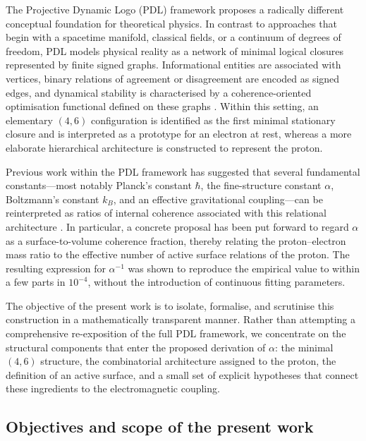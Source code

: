 \documentclass[11pt,a4paper]{article}
\theoremstyle{plain}
\theoremstyle{definition}
\theoremstyle{remark}
\begin{document}
The Projective Dynamic Logo (PDL) framework proposes a radically different conceptual foundation for theoretical physics. In contrast to approaches that begin with a spacetime manifold, classical fields, or a continuum of degrees of freedom, PDL models physical reality as a network of minimal logical closures represented by finite signed graphs. Informational entities are associated with vertices, binary relations of agreement or disagreement are encoded as signed edges, and dynamical stability is characterised by a coherence-oriented optimisation functional defined on these graphs
\cite{Laubscher2026IntroPDL,Laubscher2026PDL_English,Laubscher2026LDP_French}. Within this setting, an elementary \((4,6)\) configuration is identified as the first minimal stationary closure and is interpreted as a prototype for an electron at rest, whereas a more elaborate hierarchical architecture is constructed to represent the proton.

Previous work within the PDL framework has suggested that several fundamental constants—most notably Planck’s constant \(\hbar\), the fine-structure constant \(\alpha\), Boltzmann’s constant \(k_B\), and an effective gravitational coupling—can be reinterpreted as ratios of internal coherence associated with this relational architecture
\cite{Laubscher2026PDL_English,Laubscher2026LDP_French}. In particular, a concrete proposal has been put forward to regard \(\alpha\) as a surface-to-volume coherence fraction, thereby relating the proton–electron mass ratio to the effective number of active surface relations of the proton. The resulting expression for \(\alpha^{-1}\) was shown to reproduce the empirical value to within a few parts in \(10^{-4}\), without the introduction of continuous fitting parameters.

The objective of the present work is to isolate, formalise, and scrutinise this construction in a mathematically transparent manner. Rather than attempting a comprehensive re-exposition of the full PDL framework, we concentrate on the structural components that enter the proposed derivation of \(\alpha\): the minimal \((4,6)\) structure, the combinatorial architecture assigned to the proton, the definition of an active surface, and a small set of explicit hypotheses that connect these ingredients to the electromagnetic coupling.

\subsection{Objectives and scope of the present work}
\end{document}
